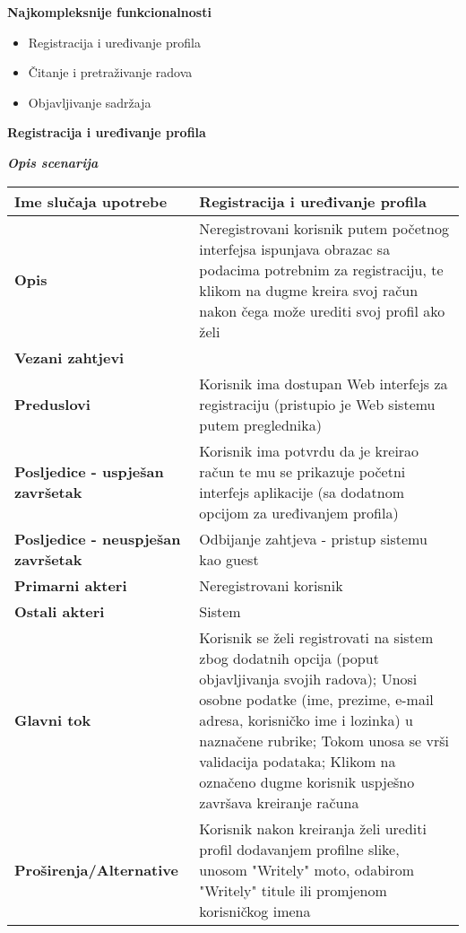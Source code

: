 \documentclass[12pt, a4paper]{report}
\begin{document}
\begin{flushleft}
{\large \textbf{Najkompleksnije funkcionalnosti}
\begin{itemize}
    \item Registracija i uređivanje profila
    \item Čitanje i pretraživanje radova
    \item Objavljivanje sadržaja \newline
\end{itemize} \newpage

\textbf{Registracija i uređivanje profila}}  \newline

\textbf{\textit{Opis scenarija}} \\
\begin{tabular}{|m{7cm}|m{7cm}|} 
 \hline
 \textbf{Ime slučaja upotrebe} & Registracija i uređivanje profila \\ 
 \hline
 \textbf{Opis} & Neregistrovani korisnik putem početnog interfejsa ispunjava obrazac sa podacima potrebnim za registraciju, te klikom na dugme kreira svoj račun nakon čega može urediti svoj profil ako želi \\ 
 \hline
 \textbf{Vezani zahtjevi} &  \\ 
 \hline
 \textbf{Preduslovi} & Korisnik ima dostupan Web interfejs za registraciju (pristupio je Web sistemu putem preglednika) \\ 
 \hline
 \textbf{Posljedice - uspješan završetak} & Korisnik ima potvrdu da je kreirao račun te mu se prikazuje početni interfejs aplikacije (sa dodatnom opcijom za uređivanjem profila) \\ 
 \hline
 \textbf{Posljedice - neuspješan završetak} & Odbijanje zahtjeva - pristup sistemu kao guest \\ 
 \hline
 \textbf{Primarni akteri} & Neregistrovani korisnik \\ 
 \hline
 \textbf{Ostali akteri} & Sistem \\ 
 \hline
 \textbf{Glavni tok} & Korisnik se želi registrovati na sistem zbog dodatnih opcija (poput objavljivanja svojih radova); Unosi osobne podatke (ime, prezime, e-mail adresa, korisničko ime i lozinka) u naznačene rubrike; Tokom unosa se vrši validacija podataka; Klikom na označeno dugme korisnik uspješno završava kreiranje računa \\ 
 \hline
 \textbf{Proširenja/Alternative} & Korisnik nakon kreiranja želi urediti profil dodavanjem profilne slike, unosom "Writely" moto, odabirom "Writely" titule ili promjenom korisničkog imena \\ 
 \hline
\end{tabular} \newpage


\end{flushleft}
\end{document}
